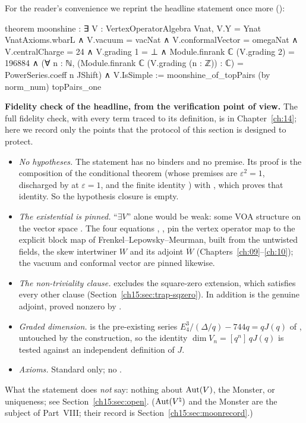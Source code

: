 For the reader's convenience we reprint the headline statement once more
():
\begin{leancode}
theorem moonshine :
    ∃ V : VertexOperatorAlgebra Vnat,
      V.Y = Ynat VnatAxioms.wbarL ∧ V.vacuum = vacNat ∧ V.conformalVector = omegaNat ∧
      V.centralCharge = 24 ∧
      V.grading 1 = ⊥ ∧
      Module.finrank ℂ (V.grading 2) = 196884 ∧
      (∀ n : ℕ, (Module.finrank ℂ (V.grading (n : ℤ)) : ℂ) = PowerSeries.coeff n JShift) ∧
      V.IsSimple :=
  moonshine_of_topPairs (by norm_num) topPairs_one
\end{leancode}

\begin{dictionary}
\textbf{Fidelity check of the headline, from the verification point of view.} The full fidelity
check, with every term traced to its definition, is in Chapter~\ref{ch:14}; here we record only the
points that the protocol of this section is designed to protect.
\begin{itemize}
\item \emph{No hypotheses.} The statement has no binders and no premise. Its proof is the
  composition of the conditional theorem  (whose premises are
  $\varepsilon^2=1$, discharged by  at $\varepsilon=1$, and the finite identity
  ) with , which proves that identity. So the hypothesis closure is
  empty.
\item \emph{The existential is pinned.} ``$\exists V$'' alone would be weak: some VOA structure on
  the vector space . The four equations ,
  ,  pin the vertex operator map to the
  explicit block map of Frenkel--Lepowsky--Meurman, built from the untwisted fields, the skew
  intertwiner $W$ and its adjoint $\overline W$ (Chapters~\ref{ch:09}--\ref{ch:10}); the vacuum and
  conformal vector are pinned likewise.
\item \emph{The non-triviality clause.}  excludes the square-zero extension, which
  satisfies every other clause (Section~\ref{ch15:sec:trap-sqzero}). In addition  is the
  genuine adjoint, proved nonzero by .
\item \emph{Graded dimension.}  is the pre-existing series $E_4^3/(\Delta/q)-744q=qJ(q)$
  of , untouched by the construction, so the identity
  $\dim V_n=[q^n]\,qJ(q)$ is tested against an independent definition of $J$.
\item \emph{Axioms.} Standard only; no .
\end{itemize}
What the statement does \emph{not} say: nothing about $\operatorname{Aut}(V)$, the Monster, or uniqueness;
see Section~\ref{ch15:sec:open}. ($\operatorname{Aut}({V^{\natural}})$ and the Monster are the subject of Part~VIII; their record is
Section~\ref{ch15:sec:moonrecord}.)
\end{dictionary}

